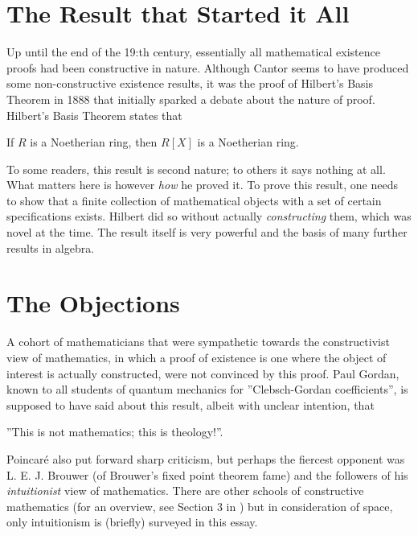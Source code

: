 \section{The Result that Started it All}
Up until the end of the 19:th century, essentially all mathematical existence proofs had been constructive in nature. Although Cantor seems to have produced some non-constructive existence results, it was the proof of Hilbert's Basis Theorem in 1888 that initially sparked a debate about the nature of proof. Hilbert's Basis Theorem states that
\begin{theorem}
If $R$ is a Noetherian ring, then $R[X]$ is a Noetherian ring.
\end{theorem}
To some readers, this result is second nature; to others it says nothing at all. What matters here is however \emph{how} he proved it. To prove this result, one needs to show that a finite collection of mathematical objects with a set of certain specifications exists. Hilbert did so without actually \emph{constructing} them, which was novel at the time. The result itself is very powerful and the basis of many further results in algebra.

\section{The Objections}
A cohort of mathematicians that were sympathetic towards the constructivist view of mathematics, in which a proof of existence is one where the object of interest is actually constructed, were not convinced by this proof. Paul Gordan, known to all students of quantum mechanics for ''Clebsch-Gordan coefficients'', is supposed to have said about this result, albeit with unclear intention, that

''This is not mathematics; this is theology!''.

Poincaré also put forward sharp criticism, but perhaps the fiercest opponent was L. E. J. Brouwer (of Brouwer's fixed point theorem fame) and the followers of his \emph{intuitionist} view of mathematics. There are other schools of constructive mathematics (for an overview, see Section 3 in \cite{bridgesConstructiveMathematics2018}) but in consideration of space, only intuitionism is (briefly) surveyed in this essay.

